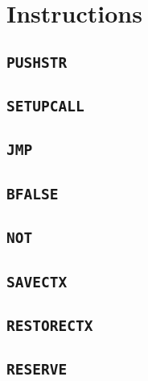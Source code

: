 \documentclass[oneside]{amsart}
\theoremstyle{definition}
\theoremstyle{remark}
\numberwithin{equation}{section}
\begin{document}
\section{Instructions}
\subsection{\texttt{PUSHSTR}}
\subsection{\texttt{SETUPCALL}}
\subsection{\texttt{JMP}}
\subsection{\texttt{BFALSE}}
\subsection{\texttt{NOT}}
\subsection{\texttt{SAVECTX}}
\subsection{\texttt{RESTORECTX}}
\subsection{\texttt{RESERVE}}

\end{document}
